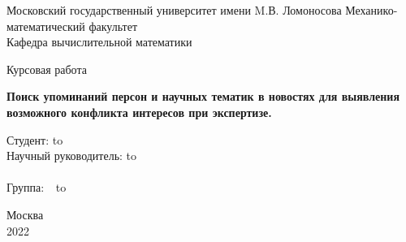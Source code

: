 \begin{titlepage}
\newpage
\begin{center}
Московский государственный университет имени M.В. Ломоносова
Механико-математический факультет \\
Кафедра вычислительной математики \\
\end{center}

\vspace{8em}

\begin{center}
\large Курсовая работа \\ 
\end{center}

\vspace{2em}

\begin{center}
\LARGE{\textbf{Поиск упоминаний персон и научных тематик в новостях для выявления возможного конфликта интересов при экспертизе.}}
\end{center}

\vspace{18em}



\newbox{\lbox}
\newlength{\maxl}
\setlength{\maxl}{\wd\lbox}
\hfill\parbox{13cm}{
\hspace*{3cm}\hspace*{-5cm}Студент:  \qquad\qquad\qquad\qquad \hbox to\\
\hspace*{3cm}\hspace*{-5cm}Научный руководитель: \hbox to\\
\\
\hspace*{3cm}\hspace*{-5cm}Группа:\qquad\qquad\qquad\qquad $\:\;\:$ \hbox to\\
}


\vspace{\fill}

\begin{center}
Москва \\2022
\end{center}

\end{titlepage}
\newpage